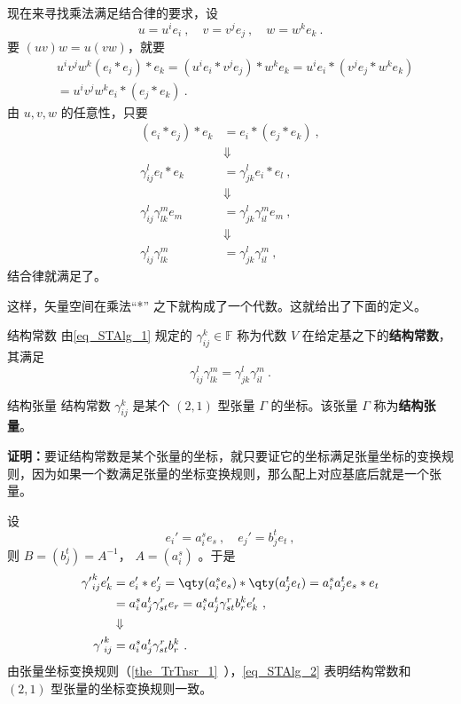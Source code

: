 现在来寻找乘法满足结合律的要求，设
\begin{equation}
u=u^ie_i~,\quad v=v^je_j~,\quad w=w^ke_k~.
\end{equation}
要 $(uv)w=u(vw)$，就要
\begin{equation}
\begin{aligned}
&u^iv^jw^k (e_i*e_j)*e_k=(u^ie_i *v^je_j)*w^ke_k=u^ie_i *(v^je_j*w^ke_k)\\
&=u^iv^jw^k e_i*(e_j*e_k)~.
\end{aligned}
\end{equation}
由 $u,v,w$ 的任意性，只要
\begin{equation}
\begin{aligned}
(e_i*e_j)*e_k&=e_i*(e_j*e_k)~,\\
&\Downarrow\\
\gamma_{ij}^le_l*e_k&=\gamma_{jk}^le_i*e_l~,\\
&\Downarrow\\
\gamma_{ij}^l\gamma_{lk}^{m}e_m&=\gamma_{jk}^l\gamma_{il}^m e_m~,\\
&\Downarrow\\
\gamma_{ij}^l\gamma_{lk}^{m}&=\gamma_{jk}^l\gamma_{il}^m~,
\end{aligned}
\end{equation}
结合律就满足了。

这样，矢量空间在乘法“*” 之下就构成了一个代数。这就给出了下面的定义。
\begin{definition}{结构常数}
由\autoref{eq_STAlg_1} 规定的 $\gamma_{ij}^k\in\mathbb F$ 称为代数 $V$ 在给定基之下的\textbf{结构常数}，其满足
\begin{equation}
\gamma_{ij}^l\gamma_{lk}^{m}=\gamma_{jk}^l\gamma_{il}^m~.
\end{equation}
\end{definition}
\begin{theorem}{结构张量}
结构常数 $\gamma_{ij}^k$ 是某个 $(2,1)$ 型张量 $\Gamma$ 的坐标。该张量 $\Gamma$ 称为\textbf{结构张量}。
\end{theorem}
\textbf{证明：}要证结构常数是某个张量的坐标，就只要证它的坐标满足张量坐标的变换规则，因为如果一个数满足张量的坐标变换规则，那么配上对应基底后就是一个张量。

设
\begin{equation}
e_i'=a_i^s e_s~,\quad e_j'=b_j^t e_t~,
\end{equation}
则 $B=(b_j^t)=A^{-1}$， $A=(a_i^s)$ 。于是
\begin{equation}\label{eq_STAlg_2}
\begin{aligned}
{\gamma'}_{ij}^ke'_k&=e'_i*e'_j=\qty(a_i^s e_s)*\qty(a_j^t e_t)=a_i^s a_j^te_s*e_t\\
&=a_i^sa_j^t\gamma_{st}^r e_r=a_i^sa_j^t\gamma_{st}^r b_r^k e'_k~,\\
&\Downarrow\\
{\gamma'}_{ij}^k&=a_i^sa_j^t\gamma_{st}^r b_r^k~.
\end{aligned}
\end{equation}
由张量坐标变换规则（\autoref{the_TrTnsr_1}~），\autoref{eq_STAlg_2} 表明结构常数和 $(2,1)$ 型张量的坐标变换规则一致。

